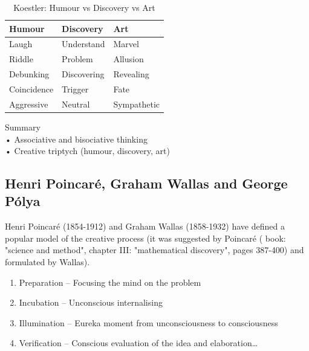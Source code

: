 \begin{table}[htbp]
\centering
\begin{tabular}{|l|l|l|}
\hline
\textbf{Humour} & \textbf{Discovery} & \textbf{Art} \\ \hline
Laugh           & Understand         & Marvel       \\ \hline
Riddle          & Problem            & Allusion     \\ \hline
Debunking       & Discovering        & Revealing    \\ \hline
Coincidence     & Trigger            & Fate         \\ \hline
Aggressive      & Neutral            & Sympathetic  \\ \hline
\end{tabular}
\caption[Humour vs Discovery vs Art]{Koestler: Humour vs Discovery vs Art}
\label{KoestlerHDA}
\end{table}

\begin{shaded}
Summary\\
•	Associative and bisociative thinking\\
•	Creative triptych (humour, discovery, art)
\end{shaded}

\subsection{Henri Poincaré, Graham Wallas and George Pólya}

Henri Poincaré (1854-1912) \citep{Poincare2001} and Graham Wallas (1858-1932) \citep{Wallas1926} have defined a popular model \citep{Boden2003, Koestler1964, Partridge1994} of the creative process (it was suggested by Poincaré  (\citep{Poincare2001} book: "science and method", chapter III: "mathematical discovery", pages 387-400) and formulated by Wallas).

\begin{enumerate}
\item Preparation – Focusing the mind on the problem
\item Incubation – Unconscious internalising
\item Illumination – Eureka moment from unconsciousness to consciousness
\item Verification – Conscious evaluation of the idea and elaboration…
\end{enumerate}

